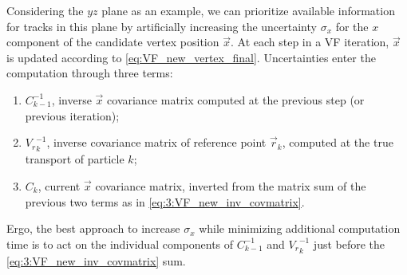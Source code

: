 Considering the $yz$ plane as an example, we can prioritize available information for tracks in this plane by artificially increasing the uncertainty $\sigma_x$ for the $x$ component of the candidate vertex position $\vec{x}$.
At each step in a VF iteration, $\vec{x}$ is updated according to \eqref{eq:VF_new_vertex_final}.
Uncertainties enter the computation through three terms:
\begin{enumerate}
	\item $C^{-1}_{k-1}$, inverse $\vec{x}$ covariance matrix computed at the previous step (or previous iteration);
	\item ${V_r}_k^{-1}$, inverse covariance matrix of reference point $\vec{r}_k$, computed at the true transport of particle $k$;
	\item $C_k$, current $\vec{x}$ covariance matrix, inverted from the matrix sum of the previous two terms as in \eqref{eq:3:VF_new_inv_covmatrix}.
\end{enumerate}
Ergo, the best approach to increase $\sigma_x$ while minimizing additional computation time is to act on the individual components of $C^{-1}_{k-1}$ and ${V_r}_k^{-1}$ just before the \eqref{eq:3:VF_new_inv_covmatrix} sum.

